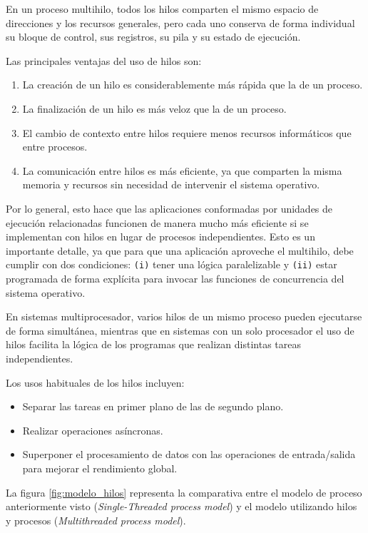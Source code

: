 En un proceso multihilo, todos los hilos comparten el mismo espacio de direcciones y los recursos generales, pero cada uno conserva de forma individual su bloque de control, sus registros, su pila y su estado de ejecución.

Las principales ventajas del uso de hilos son:
\begin{enumerate}
  \item La creación de un hilo es considerablemente más rápida que la de un proceso.
  \item La finalización de un hilo es más veloz que la de un proceso.
  \item El cambio de contexto entre hilos requiere menos recursos informáticos que entre procesos.
  \item La comunicación entre hilos es más eficiente, ya que comparten la misma memoria y recursos sin necesidad de intervenir el sistema operativo.
\end{enumerate}

Por lo general, esto hace que las aplicaciones conformadas por unidades de ejecución relacionadas funcionen de manera mucho más eficiente si se implementan con hilos en lugar de procesos independientes. Esto es un importante detalle, ya que para que una aplicación aproveche el multihilo, debe cumplir con dos condiciones: \texttt{(i)} tener una lógica paralelizable y \texttt{(ii)} estar programada de forma explícita para invocar las funciones de concurrencia del sistema operativo.

En sistemas multiprocesador, varios hilos de un mismo proceso pueden ejecutarse de forma simultánea, mientras que en sistemas con un solo procesador el uso de hilos facilita la lógica de los programas que realizan distintas tareas independientes.

Los usos habituales de los hilos incluyen:
\begin{itemize}
  \item Separar las tareas en primer plano de las de segundo plano.
  \item Realizar operaciones asíncronas.
  \item Superponer el procesamiento de datos con las operaciones de entrada/salida para mejorar el rendimiento global.
\end{itemize}

La figura \ref{fig:modelo_hilos} representa la comparativa entre el modelo de proceso anteriormente visto (\emph{Single-Threaded process model}) y el modelo utilizando hilos y procesos (\emph{Multithreaded process model}).

